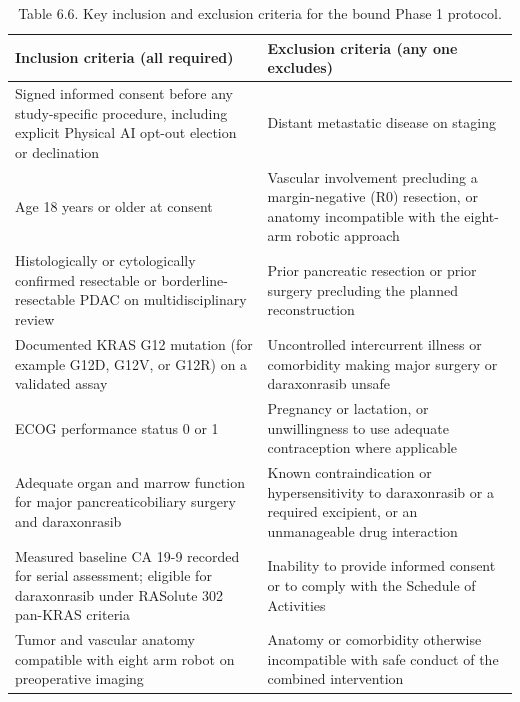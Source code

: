 \begin{table}[t]
\caption{Table 6.6. Key inclusion and exclusion criteria for the bound Phase 1
protocol.}
\label{tab:sec06-eligibility}
\centering
\begin{tabularx}{\textwidth}{Y Y}
\toprule
\textbf{Inclusion criteria (all required)} & \textbf{Exclusion criteria (any one excludes)} \\
\midrule
Signed informed consent before any study-specific procedure, including explicit Physical AI opt-out election or declination & Distant metastatic disease on staging \\
Age 18 years or older at consent & Vascular involvement precluding a margin-negative (R0) resection, or anatomy incompatible with the eight-arm robotic approach \\
Histologically or cytologically confirmed resectable or borderline-resectable PDAC on multidisciplinary review & Prior pancreatic resection or prior surgery precluding the planned reconstruction \\
Documented KRAS G12 mutation (for example G12D, G12V, or G12R) on a validated assay & Uncontrolled intercurrent illness or comorbidity making major surgery or daraxonrasib unsafe \\
ECOG performance status 0 or 1 & Pregnancy or lactation, or unwillingness to use adequate contraception where applicable \\
Adequate organ and marrow function for major pancreaticobiliary surgery and daraxonrasib & Known contraindication or hypersensitivity to daraxonrasib or a required excipient, or an unmanageable drug interaction \\
Measured baseline CA 19-9 recorded for serial assessment; eligible for daraxonrasib under RASolute 302 pan-KRAS criteria & Inability to provide informed consent or to comply with the Schedule of Activities \\
Tumor and vascular anatomy compatible with eight arm robot on preoperative imaging & Anatomy or comorbidity otherwise incompatible with safe conduct of the combined intervention \\
\bottomrule
\end{tabularx}
\end{table}

